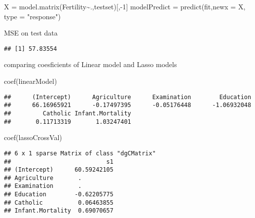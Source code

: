 \documentclass[
]{article}
\newenvironment{Shaded}{\begin{snugshade}}{\end{snugshade}}
\newcommand{\AttributeTok}[1]{\textcolor[rgb]{0.77,0.63,0.00}{#1}}
\newcommand{\DecValTok}[1]{\textcolor[rgb]{0.00,0.00,0.81}{#1}}
\newcommand{\FunctionTok}[1]{\textcolor[rgb]{0.00,0.00,0.00}{#1}}
\newcommand{\NormalTok}[1]{#1}
\newcommand{\OtherTok}[1]{\textcolor[rgb]{0.56,0.35,0.01}{#1}}
\newcommand{\SpecialCharTok}[1]{\textcolor[rgb]{0.00,0.00,0.00}{#1}}
\newcommand{\StringTok}[1]{\textcolor[rgb]{0.31,0.60,0.02}{#1}}
\begin{document}
\begin{Shaded}
\begin{Highlighting}[]
\NormalTok{X }\OtherTok{=}  \FunctionTok{model.matrix}\NormalTok{(Fertility}\SpecialCharTok{\textasciitilde{}}\NormalTok{.,testset)[,}\SpecialCharTok{{-}}\DecValTok{1}\NormalTok{]}
\NormalTok{modelPredict }\OtherTok{=} \FunctionTok{predict}\NormalTok{(fit,}\AttributeTok{newx =}\NormalTok{ X, }\AttributeTok{type =} \StringTok{"response"}\NormalTok{)}
\end{Highlighting}
\end{Shaded}

MSE on test data

\begin{Shaded}
\end{Shaded}

\begin{verbatim}
## [1] 57.83554
\end{verbatim}

comparing coesficients of Linear model and Lasso models

\begin{Shaded}
\begin{Highlighting}[]
\FunctionTok{coef}\NormalTok{(linearModel)}
\end{Highlighting}
\end{Shaded}

\begin{verbatim}
##      (Intercept)      Agriculture      Examination        Education 
##      66.16965921      -0.17497395      -0.05176448      -1.06932048 
##         Catholic Infant.Mortality 
##       0.11713319       1.03247401
\end{verbatim}

\begin{Shaded}
\begin{Highlighting}[]
\FunctionTok{coef}\NormalTok{(lassoCrossVal)}
\end{Highlighting}
\end{Shaded}

\begin{verbatim}
## 6 x 1 sparse Matrix of class "dgCMatrix"
##                           s1
## (Intercept)      60.59242105
## Agriculture       .         
## Examination       .         
## Education        -0.62205775
## Catholic          0.06463855
## Infant.Mortality  0.69070657
\end{verbatim}
\end{document}
